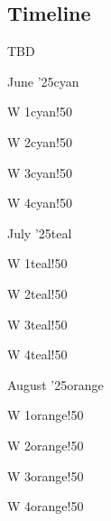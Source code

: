 \documentclass{article}
\newcommand{\release}[2]{%
        #1
        \hspace*{\fill}
        \textcolor{gray}{#2}\par}
\theoremstyle{mytheoremstyle}
\theoremstyle{mytheoremstyle}
\theoremstyle{myproblemstyle}
\begin{document}
    \subsection*{Timeline}
      TBD
      \begin{releaseyear}{June '25}{cyan}
        \begin{releasequarter}{W 1}{cyan!50}
          \release{}{}
        \end{releasequarter}
        \begin{releasequarter}{W 2}{cyan!50}
          \release{}{}
        \end{releasequarter}
        \begin{releasequarter}{W 3}{cyan!50}
          \release{}{}
        \end{releasequarter}
        \begin{releasequarter}{W 4}{cyan!50}
          \release{}{}
        \end{releasequarter}
      \end{releaseyear}
      \begin{releaseyear}{July '25}{teal}
        \begin{releasequarter}{W 1}{teal!50}
          \release{}{}
        \end{releasequarter}
        \begin{releasequarter}{W 2}{teal!50}
          \release{}{}
        \end{releasequarter}
        \begin{releasequarter}{W 3}{teal!50}
          \release{}{}
        \end{releasequarter}
        \begin{releasequarter}{W 4}{teal!50}
          \release{}{}
        \end{releasequarter}
      \end{releaseyear}
      \begin{releaseyear}{August '25}{orange}
        \begin{releasequarter}{W 1}{orange!50}
          \release{}{}
        \end{releasequarter}
        \begin{releasequarter}{W 2}{orange!50}
          \release{}{}
        \end{releasequarter}
        \begin{releasequarter}{W 3}{orange!50}
          \release{}{}
        \end{releasequarter}
        \begin{releasequarter}{W 4}{orange!50}
          \release{}{}
        \end{releasequarter}
      \end{releaseyear}
  
\end{document}
